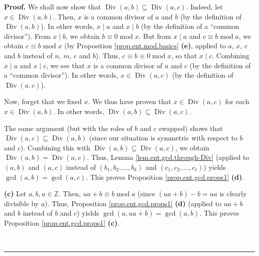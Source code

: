 \documentclass[numbers=enddot,12pt,final,onecolumn,notitlepage]{scrartcl}%
\numberwithin{exer}{subsection}
\theoremstyle{definition}
\newenvironment{proof}[1][Proof]{\noindent\textbf{#1.} }{\ \rule{0.5em}{0.5em}}
\begin{document}
\begin{proof}
We shall now show that $\operatorname*{Div}\left(  a,b\right)  \subseteq
\operatorname*{Div}\left(  a,c\right)  $. Indeed, let $x\in\operatorname*{Div}%
\left(  a,b\right)  $. Then, $x$ is a common divisor of $a$ and $b$ (by the
definition of $\operatorname*{Div}\left(  a,b\right)  $). In other words,
$x\mid a$ and $x\mid b$ (by the definition of a \textquotedblleft common
divisor\textquotedblright). From $x\mid b$, we obtain $b\equiv
0\operatorname{mod}x$. But from $x\mid a$ and $c\equiv b\operatorname{mod}a$,
we obtain $c\equiv b\operatorname{mod}x$ (by Proposition
\ref{prop.ent.mod.basics} \textbf{(e)}, applied to $a$, $x$, $c$ and $b$
instead of $n$, $m$, $c$ and $b$). Thus, $c\equiv b\equiv0\operatorname{mod}%
x$, so that $x\mid c$. Combining $x\mid a$ and $x\mid c$, we see that $x$ is a
common divisor of $a$ and $c$ (by the definition of a \textquotedblleft common
divisor\textquotedblright). In other words, $x\in\operatorname*{Div}\left(
a,c\right)  $ (by the definition of $\operatorname*{Div}\left(  a,c\right)  $).

Now, forget that we fixed $x$. We thus have proven that $x\in
\operatorname*{Div}\left(  a,c\right)  $ for each $x\in\operatorname*{Div}%
\left(  a,b\right)  $. In other words, $\operatorname*{Div}\left(  a,b\right)
\subseteq\operatorname*{Div}\left(  a,c\right)  $.

The same argument (but with the roles of $b$ and $c$ swapped) shows that
$\operatorname*{Div}\left(  a,c\right)  \subseteq\operatorname*{Div}\left(
a,b\right)  $ (since our situation is symmetric with respect to $b$ and $c$).
Combining this with $\operatorname*{Div}\left(  a,b\right)  \subseteq
\operatorname*{Div}\left(  a,c\right)  $, we obtain $\operatorname*{Div}%
\left(  a,b\right)  =\operatorname*{Div}\left(  a,c\right)  $. Thus, Lemma
\ref{lem.ent.gcd.through-Div} (applied to $\left(  a,b\right)  $ and $\left(
a,c\right)  $ instead of $\left(  b_{1},b_{2},\ldots,b_{k}\right)  $ and
$\left(  c_{1},c_{2},\ldots,c_{\ell}\right)  $) yields $\gcd\left(
a,b\right)  =\gcd\left(  a,c\right)  $. This proves Proposition
\ref{prop.ent.gcd.props1} \textbf{(d)}.

\textbf{(c)} Let $a,b,u\in\mathbb{Z}$. Then, $ua+b\equiv b\operatorname{mod}a$
(since $\left(  ua+b\right)  -b=ua$ is clearly divisible by $a$). Thus,
Proposition \ref{prop.ent.gcd.props1} \textbf{(d)} (applied to $ua+b$ and $b$
instead of $b$ and $c$) yields $\gcd\left(  a,ua+b\right)  =\gcd\left(
a,b\right)  $. This proves Proposition \ref{prop.ent.gcd.props1} \textbf{(c)}.


\end{proof}
\end{document}
